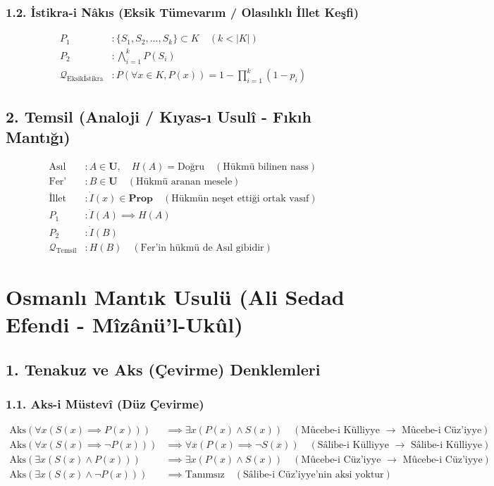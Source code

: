 \documentclass[11pt, a4paper]{article}
\begin{document}
\subsubsection{1.2. İstikra-i Nâkıs (Eksik Tümevarım / Olasılıklı İllet Keşfi)}
\begin{align}
P_1 &: \{S_1, S_2, \dots, S_k\} \subset K \quad (k < |K|) \\
P_2 &: \bigwedge_{i=1}^k P(S_i) \\
\mathcal{Q}_{\text{Eksikİstikra}} &: P\left( \forall x \in K, P(x) \right) = 1 - \prod_{i=1}^k (1 - p_i)
\end{align}

\subsection{2. Temsil (Analoji / Kıyas-ı Usulî - Fıkıh Mantığı)}
\begin{align}
\text{Asıl} &: A \in \mathbf{U}, \quad H(A) = \text{Doğru} \quad (\text{Hükmü bilinen nass}) \\
\text{Fer'} &: B \in \mathbf{U} \quad (\text{Hükmü aranan mesele}) \\
\text{İllet} &: \dot{I}(x) \in \mathbf{Prop} \quad (\text{Hükmün neşet ettiği ortak vasıf}) \\
P_1 &: \dot{I}(A) \implies H(A) \\
P_2 &: \dot{I}(B) \\
\mathcal{Q}_{\text{Temsil}} &: H(B) \quad (\text{Fer'in hükmü de Asıl gibidir})
\end{align}

\section{Osmanlı Mantık Usulü (Ali Sedad Efendi - Mîzânü'l-Ukûl)}

\subsection{1. Tenakuz ve Aks (Çevirme) Denklemleri}

\subsubsection{1.1. Aks-i Müstevî (Düz Çevirme)}
\begin{align}
\text{Aks}(\forall x (S(x) \implies P(x))) &\implies \exists x (P(x) \land S(x)) \quad (\text{Mûcebe-i Külliyye $\to$ Mûcebe-i Cüz'iyye}) \\
\text{Aks}(\forall x (S(x) \implies \neg P(x))) &\implies \forall x (P(x) \implies \neg S(x)) \quad (\text{Sâlibe-i Külliyye $\to$ Sâlibe-i Külliyye}) \\
\text{Aks}(\exists x (S(x) \land P(x))) &\implies \exists x (P(x) \land S(x)) \quad (\text{Mûcebe-i Cüz'iyye $\to$ Mûcebe-i Cüz'iyye}) \\
\text{Aks}(\exists x (S(x) \land \neg P(x))) &\implies \text{Tanımsız} \quad (\text{Sâlibe-i Cüz'iyye'nin aksi yoktur})
\end{align}
\end{document}
